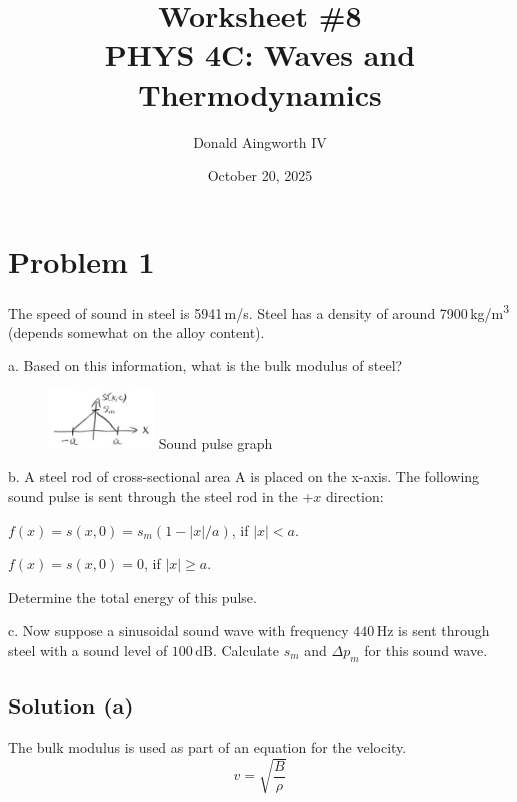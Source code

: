 \documentclass[12pt]{article}
\title{
    Worksheet \#8
    \\  \small
    PHYS 4C: Waves and Thermodynamics
    }
\author{Donald Aingworth IV}
\date{October 20, 2025}
\begin{document}

    \maketitle

    \setcounter{section}{0}
    \section{Problem 1}
        The speed of sound in steel is 5941\,\unit{\meter/\second}.
        Steel has a density of around 7900\,\unit{\kilo\gram/\meter^3} (depends somewhat on the alloy content).
        
        a. Based on this information, what is the bulk modulus of steel?

        \begin{figure}
            \includegraphics[width=0.25\textwidth]{4c-wspic-1617B.jpg} 
        Sound pulse graph
        \end{figure}
        b. A steel rod of cross-sectional area A is placed on the x-axis.  
        The following sound pulse is sent through the steel rod in the +$x$ direction:
        
        $f(x) = s(x,0) = s_m(1 - |x|/a)$, if $|x| < a$.
        
        $f(x) = s(x,0) = 0$, if $|x| \geq a$.

        
        Determine the total energy of this pulse.
        
        c. Now suppose a sinusoidal sound wave with frequency $440\,\unit{\hertz}$ is sent through steel with a sound level of $100\,\unit{\deci\bel}$.  
        Calculate $s_m$ and $\Delta p_m$ for this sound wave.

        \subsection{Solution (a)}
            The bulk modulus is used as part of an equation for the velocity.
            \begin{equation}
                v   =   \sqrt{\frac{B}{\rho}}
            \end{equation}
\end{document}
